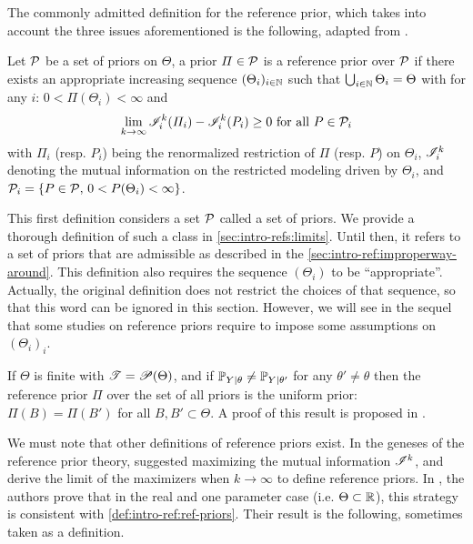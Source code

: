 The commonly admitted definition for the reference prior, which takes into account the three issues aforementioned is the following, adapted from \cite{dey_reference_2005}.
\begin{defi}\label{def:intro-ref:ref-priors}
    Let $\mathcal{P}$ be a set of priors on $\Theta$, a prior $\varPi\in\mathcal{P}$ %
    is a reference prior over $\mathcal{P}$ if there exists an appropriate increasing sequence $(\Theta_i)_{i\in\mathbb{N}}$ such that $\bigcup_{i\in\mathbb{N}}\Theta_i=\Theta$ with for any $i$: $0<\varPi(\Theta_i)<\infty  $ and
        \begin{equation}
            \lim_{k\rightarrow\infty} \mathscr{I}^k_i(\varPi_i) - \mathscr{I}^k_i(P_i) \geq 0 \text{\ for all\ } P\in\mathcal{P}_i
        \end{equation}
    with $\varPi_i$ (resp. $P_i$) being the renormalized restriction of $\varPi$ (resp. $P$) on $\Theta_i$, $\mathscr{I}_i^k$ denoting the mutual information on the restricted modeling driven by $\Theta_i$, and $\mathcal{P}_i=\{P\in\mathcal{P},\,0<P(\Theta_i)<\infty\}$.
\end{defi}

This first definition considers a set $\mathcal{P}$ called a set of priors. 
We provide a thorough definition of such a class in \cref{sec:intro-refs:limits}.
Until then, it refers to a set of priors that are admissible as described in the \cref{sec:intro-ref:improperway-around}.
This definition also
requires the sequence $(\Theta_i)$ to be ``appropriate''.
Actually,  the original definition does not restrict the choices of that sequence, so that this word can be ignored in this section.
However, we will see in the sequel that some studies on reference priors require to impose some assumptions on $(\Theta_i)_i$. 

{
\begin{ex}
    If $\Theta$ is finite with $\mathscr{T}=\mathscr{P}(\Theta)$, and if $\mathbb{P}_{Y|\theta}\ne\mathbb{P}_{Y|\theta'}$ for any $\theta'\ne\theta$ then the reference prior $\varPi$ over the set of all priors is the uniform prior: $\varPi(B)=\varPi(B')$ for all $B,B'\subset\Theta$. A proof of this result is proposed in \cite{mure_objective_2018}.
\end{ex}
}


We must note that other definitions of reference priors exist.
In the geneses of the reference prior theory, \citet{bernardo_reference_1979} suggested maximizing the mutual information $\mathscr{I}^k$, and derive the limit of the maximizers when $k\to\infty$ to define reference priors.
In \cite{berger_formal_2009}, the authors prove that in the real and one parameter case (i.e. $\Theta\subset\mathbb{R}$), this strategy is consistent with \cref{def:intro-ref:ref-priors}. Their result is the following, sometimes taken as a definition.

